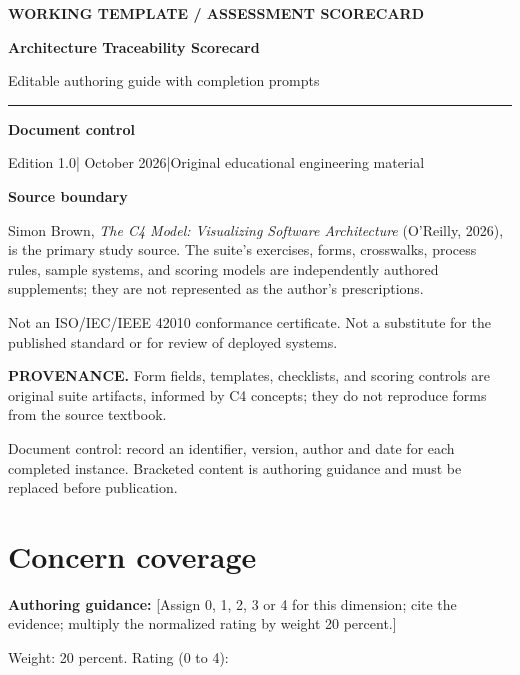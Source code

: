 \documentclass[10pt,letterpaper]{article}
\newcommand{\Prompter}[1]{\par{\small\color{C4Teal}\textbf{Authoring guidance:} #1}\par}
\newcommand{\SourceNote}[1]{\par\smallskip\noindent\colorbox{C4Light}{\parbox{0.94\linewidth}{\footnotesize\textbf{PROVENANCE.} #1}}\par\medskip}
\newcommand{\DocStart}[3]{%
\begin{document}
\begin{titlepage}
\renewcommand{\thepage}{title-\arabic{page}}
\vspace*{0.55in}
{\sffamily\bfseries\small\color{C4Teal}#1}\par\vspace{0.24in}
{\sffamily\bfseries\fontsize{26}{31}\selectfont\color{C4Navy}#2}\par\vspace{0.18in}
{\large\color{C4Gray}#3}\par\vspace{0.4in}
\textcolor{C4Teal}{\rule{\linewidth}{1.15pt}}\par\vspace{0.24in}
\textbf{Document control}\par
Edition 1.0\quad|\quad 30 October 2026\quad|\quad Original educational engineering material\par
\vspace{0.17in}
\textbf{Source boundary}\par
Simon Brown, \emph{The C4 Model: Visualizing Software Architecture} (O'Reilly, 2026), is the primary study source. The suite's exercises, forms, crosswalks, process rules, sample systems, and scoring models are independently authored supplements; they are not represented as the author's prescriptions.\par
\vfill
{\small\color{C4Gray}Not an ISO/IEC/IEEE 42010 conformance certificate. Not a substitute for the published standard or for review of deployed systems.}\par
\end{titlepage}
}
\DocStart{WORKING TEMPLATE / ASSESSMENT SCORECARD}{Architecture Traceability Scorecard}{Editable authoring guide with completion prompts}
\SourceNote{Form fields, templates, checklists, and scoring controls are original suite artifacts, informed by C4 concepts; they do not reproduce forms from the source textbook.}
Document control: record an identifier, version, author and date for each completed instance. Bracketed content is authoring guidance and must be replaced before publication.

\section{Concern coverage}

\Prompter{[Assign 0, 1, 2, 3 or 4 for this dimension; cite the evidence; multiply the normalized rating by weight 20 percent.] }
Weight: 20 percent. Rating (0 to 4):
\end{document}
